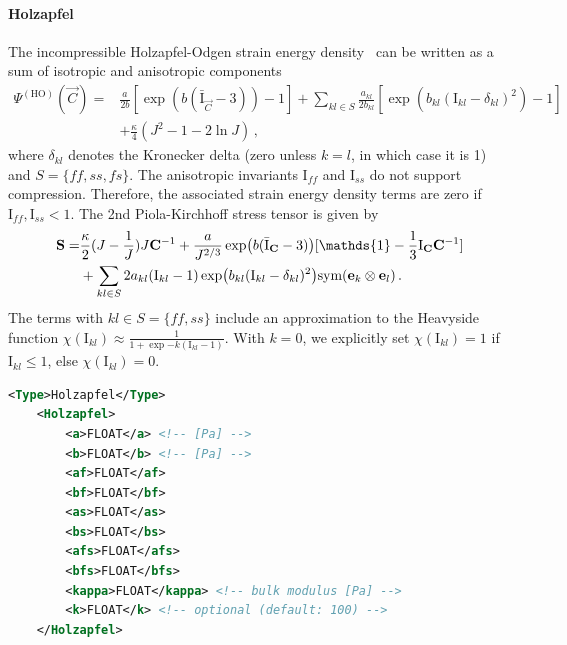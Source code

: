 \paragraph{Holzapfel}
The incompressible Holzapfel-Odgen strain energy density~\cite{Holzapfel-2009-ID13072} can be written as a sum of isotropic and anisotropic components
\begin{align}
    \Psi^{(\mathrm{HO})} (\vec C) = 
    &\frac{a}{2b} [\exp(b (\bar{\mathrm{I}}_{\vec C} - 3)) -1 ]
    + \sum_{kl \in S} \frac{a_{kl}}{2b_{kl}} [\exp(b_{kl} (\mathrm{I}_{kl} - \delta_{kl})^2) -1 ] \nonumber \\ 
    &+ \frac{\kappa}{4} (J^2 - 1 - 2\ln{J}) \label{eq:holzapfel} \,,
\end{align}
where $\delta_{kl}$ denotes the Kronecker delta (zero unless $k=l$, in which case it is 1) and $S = \{ff, ss, fs\}$.
The anisotropic invariants $\mathrm{I}_{ff}$ and $\mathrm{I}_{ss}$ do not support compression.
Therefore, the associated strain energy density terms are zero if $\mathrm{I}_{ff},\mathrm{I}_{ss} < 1$.
The 2nd Piola-Kirchhoff stress tensor is given by
\begin{align}
    \vec S =&
    \frac{\kappa}{2} (J - \frac{1}{J}) J \vec C^{-1}
    + \frac{a}{ J^{2/3}} \exp(b (\bar{\mathrm{I}}_{\vec C} - 3)) [\mathds{1} - \frac{1}{3} \I{C} \vec C^{-1}] \nonumber \\
    &+ \sum_{kl \in S} 2 a_{kl} (\mathrm{I}_{kl} - 1) \exp(b_{kl} (\mathrm{I}_{kl} - \delta_{kl})^2) \text{sym}(\vec e_k \otimes \vec e_l) \,.
\end{align}
The terms with $kl \in S = \{ff,ss\}$ include an approximation to the Heavyside function $\chi(\mathrm{I}_{kl}) \approx \frac{1}{1+\exp{-k(\mathrm{I}_{kl}-1)}}$.
With $k = 0$, we explicitly set $\chi(\mathrm{I}_{kl}) = 1$ if $\mathrm{I}_{kl} \leq 1$, else $\chi(\mathrm{I}_{kl}) = 0$.

\begin{lstlisting}[language=XML,caption=.xml settings for Holzapfel material]
    <Type>Holzapfel</Type>
    <Holzapfel>
        <a>FLOAT</a> <!-- [Pa] -->
        <b>FLOAT</b> <!-- [Pa] -->
        <af>FLOAT</af>
        <bf>FLOAT</bf>
        <as>FLOAT</as>
        <bs>FLOAT</bs>
        <afs>FLOAT</afs>
        <bfs>FLOAT</bfs>
        <kappa>FLOAT</kappa> <!-- bulk modulus [Pa] -->
        <k>FLOAT</k> <!-- optional (default: 100) -->
    </Holzapfel>
\end{lstlisting}

